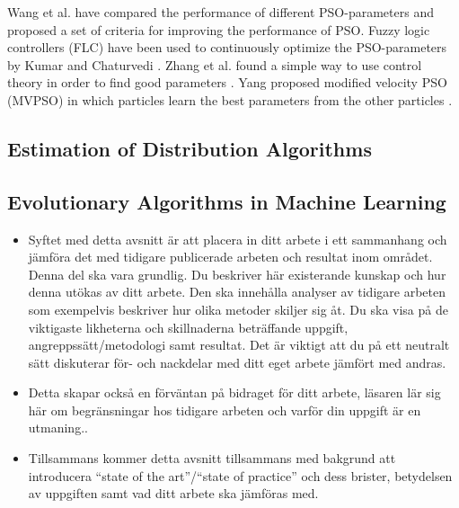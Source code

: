 Wang et al. \cite{dang2012selection} have compared the performance of different PSO-parameters and proposed a set of criteria for improving the performance of PSO. Fuzzy logic controllers (FLC) have been used to continuously optimize the PSO-parameters by Kumar and Chaturvedi \cite{kumar2011tuning}. Zhang et al. found a simple way to use control theory in order to find good parameters \cite{zhang2011simple}. Yang proposed modified velocity PSO (MVPSO) in which particles learn the best parameters from the other particles \cite{yang2011particle}.


\subsection{Estimation of Distribution Algorithms}

\subsection{Evolutionary Algorithms in Machine Learning}




{\color{blue}
\begin{itemize}
  \item Syftet med detta avsnitt \"ar att placera in ditt arbete i ett sammanhang och j\"amf\"ora det med tidigare publicerade arbeten och resultat inom omr\r{a}det. Denna del ska vara grundlig. Du beskriver h\"ar existerande kunskap och hur denna ut\"okas av ditt arbete. Den ska inneh\r{a}lla analyser av tidigare arbeten som exempelvis beskriver hur olika metoder skiljer sig \r{a}t. Du ska visa p\r{a} de viktigaste likheterna och skillnaderna betr\"affande uppgift, angreppss\"att/metodologi samt resultat. Det \"ar viktigt att du p\r{a} ett neutralt s\"att diskuterar f\"or- och nackdelar med ditt eget arbete j\"amf\"ort med andras.
  \item Detta skapar ocks\r{a} en f\"orv\"antan p\r{a} bidraget f\"or ditt arbete, l\"asaren l\"ar sig h\"ar om begr\"ansningar hos tidigare arbeten och varf\"or din uppgift \"ar en utmaning..
  \item Tillsammans kommer detta avsnitt tillsammans med bakgrund att introducera ``state of the art''/``state of practice'' och dess brister, betydelsen av uppgiften samt vad ditt arbete ska j\"amf\"oras med.
\end{itemize}




}

